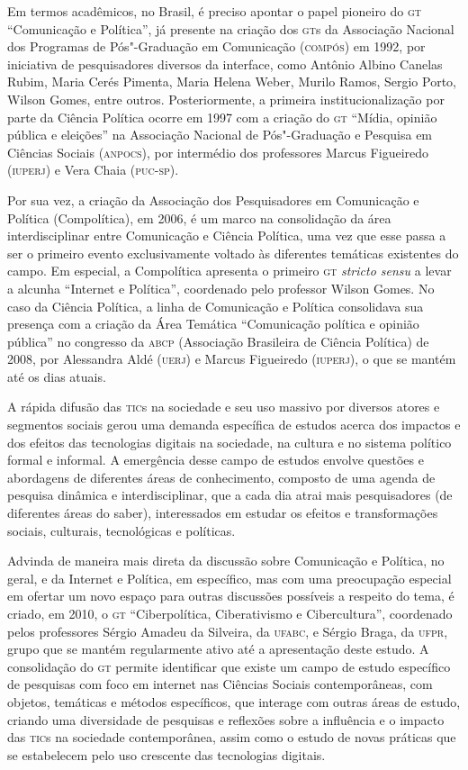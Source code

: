 Em termos acadêmicos, no Brasil, é preciso apontar o papel pioneiro do
\textsc{gt} ``Comunicação e Política'', já presente na criação dos \textsc{gt}s da
Associação Nacional dos Programas de Pós"-Graduação em Comunicação
(\textsc{compós}) em 1992, por iniciativa de pesquisadores diversos da interface,
como Antônio Albino Canelas Rubim, Maria Cerés Pimenta, Maria Helena
Weber, Murilo Ramos, Sergio Porto, Wilson Gomes, entre outros.
Posteriormente, a primeira institucionalização por parte da Ciência
Política ocorre em 1997 com a criação do \textsc{gt} ``Mídia, opinião pública e
eleições'' na Associação Nacional de Pós"-Graduação e Pesquisa em
Ciências Sociais (\textsc{anpocs}), por intermédio dos professores Marcus
Figueiredo (\textsc{iuperj}) e Vera Chaia (\textsc{puc}-\textsc{sp}).

Por sua vez, a criação da Associação dos Pesquisadores em Comunicação e
Política (Compolítica), em 2006, é um marco na consolidação da área
interdisciplinar entre Comunicação e Ciência Política, uma vez que esse
passa a ser o primeiro evento exclusivamente voltado às diferentes
temáticas existentes do campo. Em especial, a Compolítica apresenta o
primeiro \textsc{gt} \emph{stricto sensu} a levar a alcunha ``Internet e
Política'', coordenado pelo professor Wilson Gomes. No caso da Ciência
Política, a linha de Comunicação e Política consolidava sua presença com
a criação da Área Temática ``Comunicação política e opinião pública'' no
congresso da \textsc{abcp} (Associação Brasileira de Ciência Política) de 2008,
por Alessandra Aldé (\textsc{uerj}) e Marcus Figueiredo (\textsc{iuperj}), o que se mantém
até os dias atuais.

A rápida difusão das \textsc{tic}s na sociedade e seu uso massivo por diversos
atores e segmentos sociais gerou uma demanda específica de estudos
acerca dos impactos e dos efeitos das tecnologias digitais na sociedade,
na cultura e no sistema político formal e informal. A emergência desse
campo de estudos envolve questões e abordagens de diferentes áreas de
conhecimento, composto de uma agenda de pesquisa dinâmica e
interdisciplinar, que a cada dia atrai mais pesquisadores (de diferentes
áreas do saber), interessados em estudar os efeitos e transformações
sociais, culturais, tecnológicas e políticas.

Advinda de maneira mais direta da discussão sobre Comunicação e
Política, no geral, e da Internet e Política, em específico, mas com uma
preocupação especial em ofertar um novo espaço para outras discussões
possíveis a respeito do tema, é criado, em 2010, o \textsc{gt} ``Ciberpolítica,
Ciberativismo e Cibercultura'', coordenado pelos professores Sérgio
Amadeu da Silveira, da \textsc{ufabc}, e Sérgio Braga, da \textsc{ufpr}, grupo que se
mantém regularmente ativo até a apresentação deste estudo. A
consolidação do \textsc{gt} permite identificar que existe um campo de estudo
específico de pesquisas com foco em internet nas Ciências Sociais
contemporâneas, com objetos, temáticas e métodos específicos, que
interage com outras áreas de estudo, criando uma diversidade de
pesquisas e reflexões sobre a influência e o impacto das \textsc{tic}s na
sociedade contemporânea, assim como o estudo de novas práticas que se
estabelecem pelo uso crescente das tecnologias digitais.

